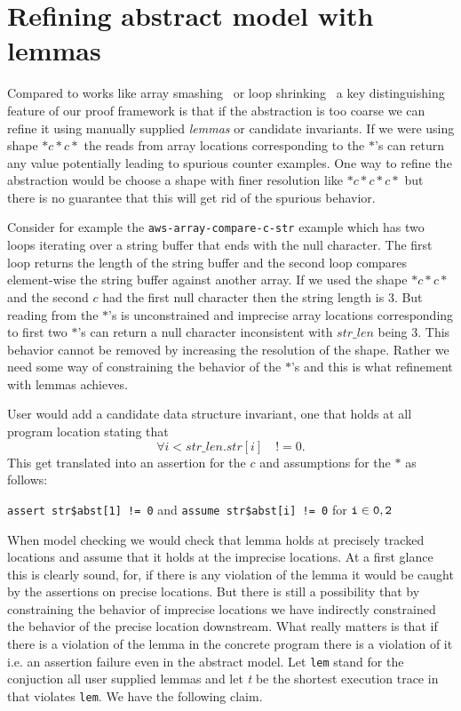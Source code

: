 \section{Refining abstract model with lemmas}

Compared to works like array smashing~\cite{} or loop
shrinking~\cite{loopshrink} a key distinguishing feature of our proof
framework is that if the abstraction is too coarse we can refine it
using manually supplied \emph{lemmas} or candidate invariants. If we
were using shape \(*c*c*\) the reads from array locations
corresponding to the \(*\)'s can return any value potentially leading to
spurious counter examples. One way to refine the abstraction would be
choose a shape with finer resolution like \(*c*c*c*\) but there is no
guarantee that this will get rid of the spurious behavior.

Consider for example the {\tt aws-array-compare-c-str} example which
has two loops iterating over a string buffer that ends with the null
character. The first loop returns the length of the string buffer and
the second loop compares element-wise the string buffer against
another array. If we used the shape \(*c*c*\) and the second \(c\) had
the first null character then the string length is \(3\). But reading
from the \(*\)'s is unconstrained and imprecise array locations
corresponding to first two \(*\)'s can return a null character
inconsistent with \(str\_len\) being 3. This behavior cannot be removed by
increasing the resolution of the shape. Rather we need some way of
constraining the behavior of the \(*\)'s and this is what refinement
with lemmas achieves.

User would add a candidate data structure invariant, one that holds at
all program location stating that \[\forall i < str\_len.str[i] \quad
!= 0.\] This get translated into an assertion for the \(c\) and
assumptions for the \(*\) as follows:

{\tt assert str\$abst[1] != 0}
and
{\tt assume str\$abst[i] != 0} for \({\tt i} \in {\tt 0,2}\)

When model checking \progabst we would check that lemma holds at
precisely tracked locations and assume that it holds at the imprecise
locations. At a first glance this is clearly sound, for, if there is
any violation of the lemma it would be caught by the assertions
on precise locations. But there is still a possibility that by constraining the
behavior of imprecise locations we have indirectly constrained the
behavior of the precise location downstream. What really matters is
that if there is a violation of the lemma in the concrete program
there is a violation of it i.e. an assertion failure even in the
abstract model. Let {\tt lem} stand for the conjuction all user
supplied lemmas and let \emph{t} be the shortest execution trace
in \prog that violates {\tt lem}. We have the following claim.

